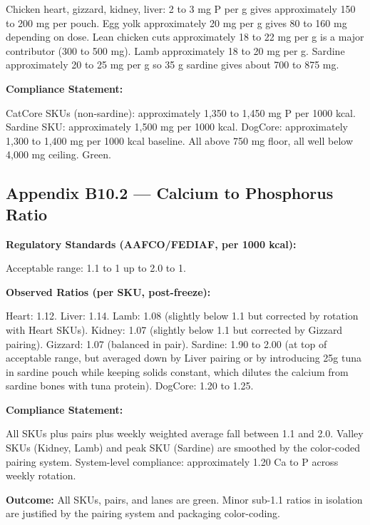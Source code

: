 Chicken heart, gizzard, kidney, liver: 2 to 3 mg P per g gives approximately 150 to 200 mg per pouch. Egg yolk approximately 20 mg per g gives 80 to 160 mg depending on dose. Lean chicken cuts approximately 18 to 22 mg per g is a major contributor (300 to 500 mg). Lamb approximately 18 to 20 mg per g. Sardine approximately 20 to 25 mg per g so 35 g sardine gives about 700 to 875 mg.

\textbf{Compliance Statement:}  

CatCore SKUs (non-sardine): approximately 1,350 to 1,450 mg P per 1000 kcal. Sardine SKU: approximately 1,500 mg per 1000 kcal. DogCore: approximately 1,300 to 1,400 mg per 1000 kcal baseline. All above 750 mg floor, all well below 4,000 mg ceiling. Green.

\subsection*{Appendix B10.2 --- Calcium to Phosphorus Ratio}

\textbf{Regulatory Standards (AAFCO/FEDIAF, per 1000 kcal):}  

Acceptable range: 1.1 to 1 up to 2.0 to 1.

\textbf{Observed Ratios (per SKU, post-freeze):}  

Heart: 1.12. Liver: 1.14. Lamb: 1.08 (slightly below 1.1 but corrected by rotation with Heart SKUs). Kidney: 1.07 (slightly below 1.1 but corrected by Gizzard pairing). Gizzard: 1.07 (balanced in pair). Sardine: 1.90 to 2.00 (at top of acceptable range, but averaged down by Liver pairing or by introducing 25g tuna in sardine pouch while keeping solids constant, which dilutes the calcium from sardine bones with tuna protein). DogCore: 1.20 to 1.25.

\textbf{Compliance Statement:}  

All SKUs plus pairs plus weekly weighted average fall between 1.1 and 2.0. Valley SKUs (Kidney, Lamb) and peak SKU (Sardine) are smoothed by the color-coded pairing system. System-level compliance: approximately 1.20 Ca to P across weekly rotation.

\textbf{Outcome:} All SKUs, pairs, and lanes are green. Minor sub-1.1 ratios in isolation are justified by the pairing system and packaging color-coding.
